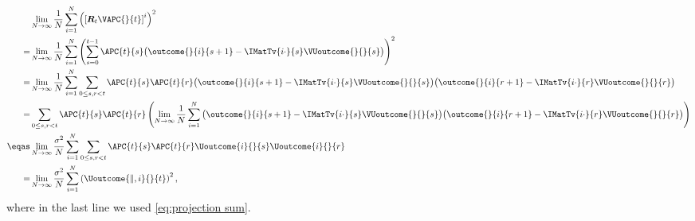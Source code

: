 \begin{enumerate}[label=(\alph*)]
\begin{equation}
        \label{eq:BL-proof-bt-simple-7}
            \begin{aligned}
                &\lim_{N \rightarrow \infty}
                \frac{1}{N}
                \sum_{i=1}^N
                \left(
                \left[
                \bm{R}_t
                \VAPC{}{t}
                \right]^i
                \right)^2
                \\
                =
                &\lim_{N \rightarrow \infty}
                \frac{1}{N}
                \sum_{i=1}^N
                \left(
                \sum_{s=0}^{t-1}
                \APC{t}{s}
                \big(
                \outcome{}{i}{s+1}
                - \IMatTv{i \cdot}{s} \VUoutcome{}{}{s}
                \big)
                \right)^2
                \\
                =
                &\lim_{N \rightarrow \infty}
                \frac{1}{N}
                \sum_{i=1}^N
                \sum_{0\leq s,r < t}
                \APC{t}{s}
                \APC{t}{r}
                \big(
                \outcome{}{i}{s+1} - \IMatTv{i \cdot}{s} \VUoutcome{}{}{s}
                \big)
                \big(
                \outcome{}{i}{r+1} - \IMatTv{i \cdot}{r} \VUoutcome{}{}{r}
                \big)
                \\
                =
                &\sum_{0\leq s,r < t}
                \APC{t}{s}
                \APC{t}{r}
                \left(
                \lim_{N \rightarrow \infty}
                \frac{1}{N}
                \sum_{i=1}^N
                \big(
                \outcome{}{i}{s+1} - \IMatTv{i \cdot}{s} \VUoutcome{}{}{s}
                \big)
                \big(
                \outcome{}{i}{r+1} - \IMatTv{i \cdot}{r} \VUoutcome{}{}{r}
                \big)\right)
                \\
                \eqas
                & \lim_{N \rightarrow \infty}
                \frac{\sigma^2}{N}
                \sum_{i=1}^N
                \sum_{0\leq s,r < t}
                \APC{t}{s}
                \APC{t}{r}
                \Uoutcome{i}{}{s} \Uoutcome{i}{}{r}
                \\
                =
                &\lim_{N \rightarrow \infty}
                \frac{\sigma^2}{N}
                \sum_{i=1}^N
                \left(\Uoutcome{\parallel,i}{}{t}\right)^2,
            \end{aligned}
        \end{equation}
        where in the last line we used \eqref{eq:projection sum}.


\end{enumerate}
